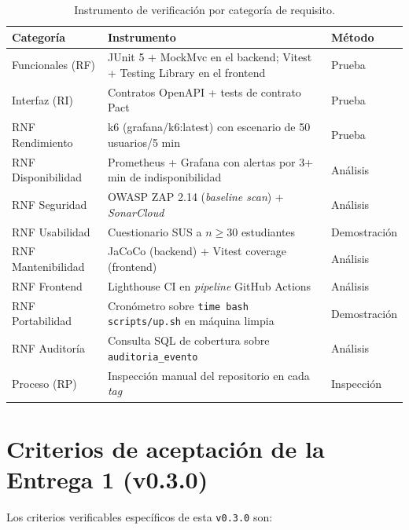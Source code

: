 \documentclass[11pt,a4paper,twoside]{report}
\begin{document}
\begin{table}[htbp]
    \centering
    \small
    \caption{Instrumento de verificaci\'on por categor\'ia de requisito.}
    \label{tab:verificacion}
    \begin{tabularx}{\textwidth}{@{}lXl@{}}
        \toprule
        \textbf{Categor\'ia} & \textbf{Instrumento} & \textbf{M\'etodo} \\
        \midrule
        Funcionales (RF)    & JUnit 5 + MockMvc en el backend; Vitest + Testing Library en el frontend & Prueba \\
        Interfaz (RI)       & Contratos OpenAPI + tests de contrato Pact & Prueba \\
        RNF Rendimiento     & k6 (grafana/k6:latest) con escenario de 50 usuarios/5 min & Prueba \\
        RNF Disponibilidad  & Prometheus + Grafana con alertas por 3+ min de indisponibilidad & An\'alisis \\
        RNF Seguridad       & OWASP ZAP 2.14 (\emph{baseline scan}) + \emph{SonarCloud} & An\'alisis \\
        RNF Usabilidad      & Cuestionario SUS \cite{brooke1996sus} a $n \geq 30$ estudiantes & Demostraci\'on \\
        RNF Mantenibilidad  & JaCoCo (backend) + Vitest coverage (frontend) & An\'alisis \\
        RNF Frontend        & Lighthouse CI en \emph{pipeline} GitHub Actions & An\'alisis \\
        RNF Portabilidad    & Cron\'ometro sobre \texttt{time bash scripts/up.sh} en m\'aquina limpia & Demostraci\'on \\
        RNF Auditor\'ia     & Consulta SQL de cobertura sobre \texttt{auditoria\_evento} & An\'alisis \\
        Proceso (RP)        & Inspecci\'on manual del repositorio en cada \emph{tag} & Inspecci\'on \\
        \bottomrule
    \end{tabularx}
\end{table}

\section{Criterios de aceptaci\'on de la Entrega 1 (v0.3.0)}

Los criterios verificables espec\'ificos de esta \texttt{v0.3.0} son:
\end{document}
